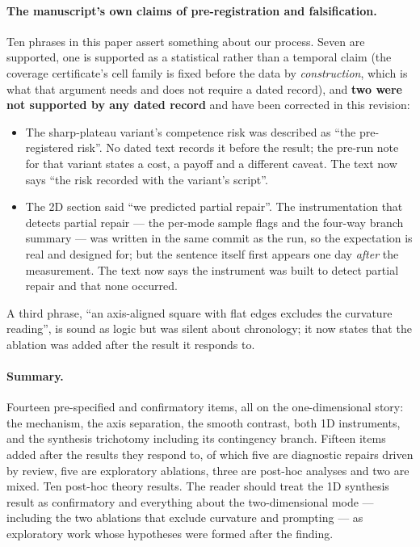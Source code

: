 \paragraph{The manuscript's own claims of pre-registration and falsification.} Ten phrases
in this paper assert something about our process. Seven are supported, one is supported as a
statistical rather than a temporal claim (the coverage certificate's cell family is fixed
before the data by \emph{construction}, which is what that argument needs and does not
require a dated record), and \textbf{two were not supported by any dated record} and have
been corrected in this revision:
\begin{itemize}
\item The sharp-plateau variant's competence risk was described as ``the pre-registered
risk''. No dated text records it before the result; the pre-run note for that variant states
a cost, a payoff and a different caveat. The text now says ``the risk recorded with the
variant's script''.
\item The 2D section said ``we predicted partial repair''. The instrumentation that detects
partial repair --- the per-mode sample flags and the four-way branch summary --- was written
in the same commit as the run, so the expectation is real and designed for; but the sentence
itself first appears one day \emph{after} the measurement. The text now says the instrument
was built to detect partial repair and that none occurred.
\end{itemize}
A third phrase, ``an axis-aligned square with flat edges excludes the curvature reading'',
is sound as logic but was silent about chronology; it now states that the ablation was added
after the result it responds to.

\paragraph{Summary.} Fourteen pre-specified and confirmatory items, all on the
one-dimensional story: the mechanism, the axis separation, the smooth contrast, both 1D
instruments, and the synthesis trichotomy including its contingency branch. Fifteen items
added after the results they respond to, of which five are diagnostic repairs driven by
review, five are exploratory ablations, three are post-hoc analyses and two are mixed. Ten
post-hoc theory results. The reader should treat the 1D synthesis result as confirmatory and
everything about the two-dimensional mode --- including the two ablations that exclude
curvature and prompting --- as exploratory work whose hypotheses were formed after the
finding.
